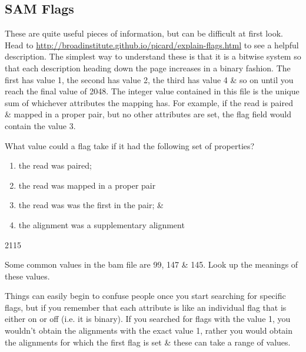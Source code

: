 \subsection{SAM Flags}
\begin{information}
These are quite useful pieces of information, but can be difficult at first look.
Head to \url{http://broadinstitute.github.io/picard/explain-flags.html} to see a helpful description.
The simplest way to understand these is that it is a bitwise system so that each description heading down the page increases in a binary fashion.
The first has value 1, the second has value 2, the third has value 4 \& so on until you reach the final value of 2048.
The integer value contained in this file is the unique sum of whichever attributes the mapping has.
For example, if the read is paired \& mapped in a proper pair, but no other attributes are set, the flag field would contain the value 3.
\end{information}

\begin{questions}
What value could a flag take if it had the following set of properties?
	\begin{enumerate}
	\item the read was paired;
	\item the read was mapped in a proper pair
	\item the read was was the first in the pair; \&
	\item the alignment was a supplementary alignment
	\end{enumerate}
\begin{answer}
2115 \\
\end{answer}
Some common values in the bam file are 99, 147 \& 145.
Look up the meanings of these values. \\
\end{questions}

\begin{information}
Things can easily begin to confuse people once you start searching for specific flags, but if you remember that each attribute is like an individual flag that is either on or off (i.e. it is binary).
If you searched for flags with the value 1, you wouldn't obtain the alignments with the exact value 1, rather you would obtain the alignments for which the first flag is set \& these can take a range of values.
\end{information}

